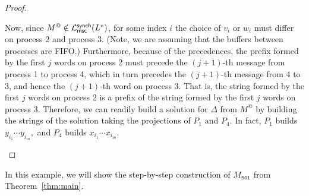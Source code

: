 \begin{proof}
\begin{itemize}
			Now, since $M^@\notin \mathcal{L}_{\mathsf{msc}}^{\mathsf{synch}}(L^*)$, for some index $i$ the choice of $v_i$ or
			$w_i$ must differ on process 2 and process 3. (Note, we are assuming that
			the buffers between processes are FIFO.)
			Furthermore, because of the precedences, the prefix formed by the first
			$j$ words on process 2 must precede the $(j + 1)$-th message from
			process 1 to process 4, which in turn precedes the $(j + 1)$-th message
			from 4 to 3, and hence the $(j + 1)$-th word on process 3. That is, the
			string formed by the first $j$ words on process 2 is a prefix of the string
			formed by the first $j$ words on process 3. Therefore, we can readily
			build a solution for $\Delta$ from $M^@$ by building the strings of the solution
			taking the projections of $P_1$ and $P_4$. In fact, $P_1$ builds 
			$y_{i_1}\cdots y_{i_m},$ and $P_4$ builds $x_{i_1}\cdots x_{i_m}$.

	\end{itemize}

\end{proof}

In this example, we will show the step-by-step construction 
of $M_{\texttt{sol}}$ from Theorem~\ref{thm:main}.

\bigskip

